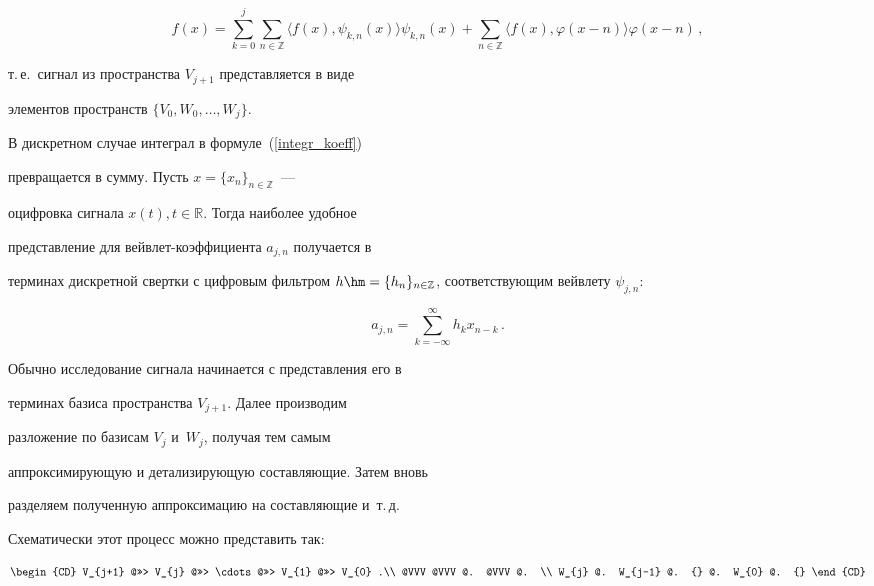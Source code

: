 \begin{equation*}

    \label{fin_decomposition}

f(x)=\sum\limits_{k=0}^{j}{\sum_{n \in \mathbb{Z}}{\langle f(x),\psi_{k,n}(x)\rangle 

\psi_{k,n}(x)}}+\sum_{n \in \mathbb{Z}}{\langle f(x),\varphi(x-n)\rangle \varphi(x-n)}\,,

\end{equation*}

т.\,е.\ сигнал из пространства $V_{j+1}$ представляется в виде

элементов пространств $\{V_0, W_0, \ldots, W_j\}$.



В дискретном случае интеграл в формуле~(\ref{integr_koeff})

превращается в сумму. Пусть $x=\{x_n\}_{n \in \mathbb{Z}}$~---

оцифровка сигнала $x(t), t \in \mathbb{R}$. Тогда наиболее удобное

представление для вейвлет-коэффициента $a_{j,n}$ получается в

терминах дискретной свертки с цифровым фильтром $h\hm=\{h_n\}_{n \in

\mathbb{Z}}$, соответствующим вейвлету $\psi_{j,n}$:

\begin{equation*}


        a_{j,n}=\sum_{k=-\infty}^{\infty}{h_k x_{n-k}}\,.

\end{equation*}



Обычно исследование сигнала начинается с представления его в

терминах базиса пространства $V_{j+1}$. Далее производим

разложение по базисам $V_{j}$ и~$W_{j}$, получая тем самым

аппроксимирующую и детализирующую со\-став\-ля\-ющие. Затем вновь

разделяем полученную аппроксимацию на составляющие и~т.\,д.\

Схематически этот процесс можно представить так:

\begin{equation*}

\begin{CD}

 V_{j+1} @>>> V_{j} @>>> \cdots @>>> V_{1} @>>> V_{0} .\\

  @VVV        @VVV        @.      @VVV       @.  \\

  W_{j}   @. W_{j-1} @.   {}   @. W_{0}  @.  {}

\end{CD}

\end{equation*}

